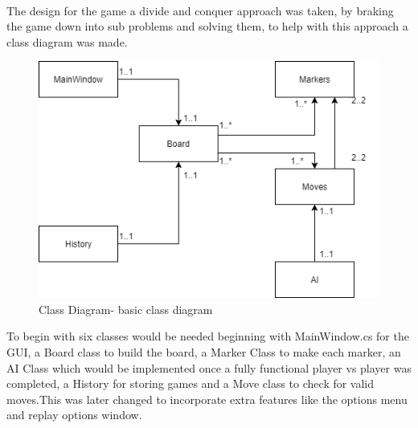 \documentclass[10pt, a4paper]{article}
\begin{document}
\paragraph{}
	The design for the game a divide and conquer approach was taken, by braking the game down into sub problems and solving them, to help with this approach a class diagram was made.
	\begin{figure}[H]
  	\centering
  	\includegraphics[scale = 0.4]{class-diagram}
  	\caption{Class Diagram- basic class diagram}
  	\label{fig:nonfloat}
	\end{figure}
To begin with six classes would be needed beginning with MainWindow.cs for the GUI, a Board class to build the board, a Marker Class to make each marker, an AI Class which would be implemented once a fully functional player vs player was completed, a History for storing games and a Move class to check for valid moves.This was later changed to incorporate extra features like the options menu and replay options window.
\end{document}

